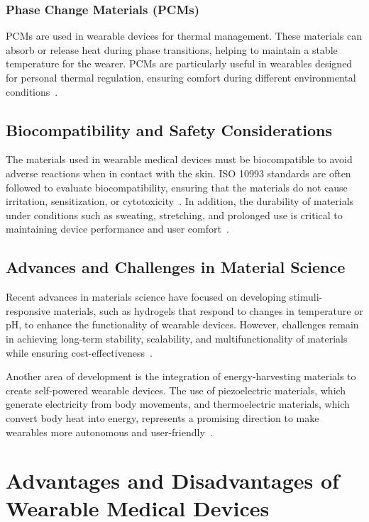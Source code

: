 \documentclass[journal]{IEEEtran}
\begin{document}
        \subsubsection{Phase Change Materials (PCMs)}

        PCMs are used in wearable devices for thermal management. These materials can absorb or release heat during phase transitions, helping to maintain a stable temperature for the wearer. PCMs are particularly useful in wearables designed for personal thermal regulation, ensuring comfort during different environmental conditions~\cite{Yang2024}.

    \subsection{Biocompatibility and Safety Considerations}

    The materials used in wearable medical devices must be biocompatible to avoid adverse reactions when in contact with the skin. ISO 10993 standards are often followed to evaluate biocompatibility, ensuring that the materials do not cause irritation, sensitization, or cytotoxicity~\cite{ISO2018}. In addition, the durability of materials under conditions such as sweating, stretching, and prolonged use is critical to maintaining device performance and user comfort~\cite{Chen2020}.

    \subsection{Advances and Challenges in Material Science}

    Recent advances in materials science have focused on developing stimuli-responsive materials, such as hydrogels that respond to changes in temperature or pH, to enhance the functionality of wearable devices. However, challenges remain in achieving long-term stability, scalability, and multifunctionality of materials while ensuring cost-effectiveness~\cite{Trovato2022}.

    Another area of development is the integration of energy-harvesting materials to create self-powered wearable devices. The use of piezoelectric materials, which generate electricity from body movements, and thermoelectric materials, which convert body heat into energy, represents a promising direction to make wearables more autonomous and user-friendly~\cite{Pantrangi2024}.

\section{Advantages and Disadvantages of Wearable Medical Devices}
\label{7.Advantages}
\end{document}
